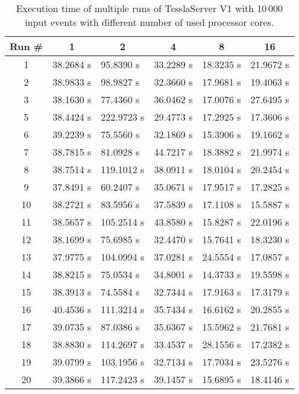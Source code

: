 \begin{table}[!htb]
  \centering
  \caption{Execution time of multiple runs of TesslaServer V1 with 10\,000 input events with different number of used processor cores.}
  \label{table:tessla_server_v1_num_cores_data}
  \begin{tabular}{clllll}
    Run \# &\multicolumn{1}{c}{1} & \multicolumn{1}{c}{2} & \multicolumn{1}{c}{4} & \multicolumn{1}{c}{8} & \multicolumn{1}{c}{16} \\ \hline
    1 & 38.2684 s & 95.8390 s  & 33.2289 s & 18.3235 s & 21.9672 s \\
    2 & 38.9833 s & 98.9827 s  & 32.3660 s   & 17.9681 s & 19.4063 s \\
    3 & 38.1630 s & 77.4360 s  & 36.0462 s & 17.0076 s & 27.6495 s \\
    5 & 38.4424 s & 222.9723 s & 29.4773 s & 17.2925 s & 17.3606 s \\
    6 &  39.2239 s & 75.5560 s  & 32.1869 s & 15.3906 s & 19.1662 s  \\
    7 &  38.7815 s & 81.0928 s  & 44.7217 s & 18.3882 s & 21.9974 s \\
    8 &  38.7514 s & 119.1012 s & 38.0911 s & 18.0104 s & 20.2454 s \\
    9 &  37.8491 s & 60.2407 s  & 35.0671 s & 17.9517 s & 17.2825 s \\
    10 &  38.2721 s & 83.5956 s  & 37.5839 s & 17.1108 s & 15.5887 s \\
    11 &  38.5657 s & 105.2514 s & 43.8580 s & 15.8287 s & 22.0196 s \\
    12 &  38.1699 s & 75.6985 s   & 32.4470 s  & 15.7641 s & 18.3230 s \\
    13 &  37.9775 s & 104.0994 s & 37.0281 s & 24.5554 s & 17.0857 s \\
    14 &  38.8215 s & 75.0534 s    & 34.8001 s & 14.3733 s & 19.5598 s \\
    15 &  38.3913 s & 74.5584 s  & 32.7344 s & 17.9163 s  & 17.3179 s \\
    16 &  40.4536 s & 111.3214 s & 35.7434 s  & 16.6162 s & 20.2855 s \\
    17 &  39.0735 s & 87.0386 s  & 35.6367 s & 15.5962 s & 21.7681 s \\
    18 &  38.8830 s & 114.2697 s & 33.4537 s & 28.1556 s & 17.2382 s \\
    19 &  39.0799 s & 103.1956 s & 32.7134 s & 17.7034 s & 23.5276 s \\
    20 &  39.3866 s & 117.2423 s & 39.1457 s & 15.6895 s & 18.4146 s
  \end{tabular}
\end{table}

